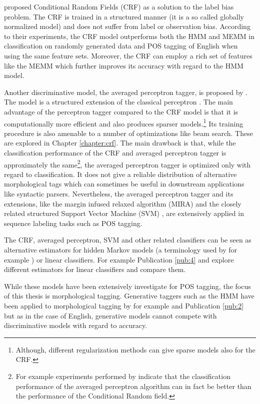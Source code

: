 \cite{Lafferty2001} proposed Conditional Random Fields (CRF) as a
solution to the label bias problem. The CRF is trained in a structured
manner (it is a so called globally normalized model) and does not
suffer from label or observation bias. According to their experiments,
the CRF model outperforms both the HMM and MEMM in classification on
randomly generated data and POS tagging of English when using the same
feature sets. Moreover, the CRF can employ a rich set of features like
the MEMM which further improves its accuracy with regard to the HMM
model.

Another discriminative model, the averaged perceptron tagger, is
proposed by \cite{Collins2002}. The model is a
structured extension of the classical perceptron
\citep{Rosenblatt1958}. The main advantage of the perceptron tagger
compared to the CRF model is that it is computationally more efficient
and also produces sparser models.\footnote{Although, different
  regularization methods can give sparse models also for the CRF.} Its
training procedure is also amenable to a number of optimizations like
beam search. These are explored in Chapter \ref{chapter:crf}. The main
drawback is that, while the classification performance of the CRF and
averaged perceptron tagger is approximately the same\footnote{For
  example experiments performed by \cite{Nguyen2007} indicate that the
  classification performance of the averaged perceptron algorithm can
  in fact be better than the performance of the Conditional Random
  field.}, the averaged perceptron tagger is optimized only with
regard to classification. It does not give a reliable distribution of
alternative morphological tags which can sometimes be useful in
downstream applications like syntactic parsers. Nevertheless, the
averaged perceptron tagger and its extensions, like the margin infused
relaxed algorithm (MIRA) \cite{Taskar2003} and the closely related
structured Support Vector Machine (SVM) \citep{Tsochantaridis2005},
are extensively applied in sequence labeling tasks such as POS
tagging.

The CRF, averaged perceptron, SVM and other related classifiers can be
seen as alternative estimators for hidden Markov models (a terminology
used by for example \cite{Collins2002}) or linear classifiers. For
example Publication \ref{pub:4} and \cite{Nguyen2007} explore different
estimators for linear classifiers and compare them.

While these models have been extensively investigate for POS tagging,
the focus of this thesis is morphological tagging. Generative taggers
such as the HMM have been applied to morphological tagging by for
example \cite{Halacsy2007} and Publication \ref{pub:2} but as in the
case of English, generative models cannot compete with discriminative
models with regard to accuracy.

